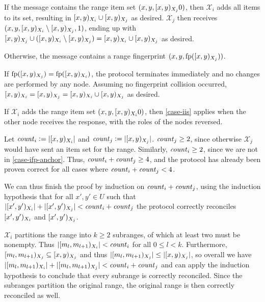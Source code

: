 \begin{caselist}
 \label{case-iis}  If the message contains the range item set $({x}, {y}, [{x},{y})_{X_j}{0})$, then $\mathcal{X}_i$ adds all items to its set, resulting in $[{x},{y})_{X_i} \cup [{x},{y})_{X_j}$ as desired. $\mathcal{X}_j$ then receives $({x}, {y}, {[{x},{y})_{X_i} \setminus [{x},{y})_{X_j}}, {1})$, ending up with $[{x},{y})_{X_j} \cup ([{x},{y})_{X_i} \setminus [{x},{y})_{X_j}) = [{x},{y})_{X_i} \cup [{x},{y})_{X_j}$ as desired.

 \label{case-ifp} Otherwise, the message contains a range fingerprint $({x}, {y}, {\operatorname{fp}([{x},{y})_{X_j})})$.

\begin{caselist}
 If $\operatorname{fp}([{x},{y})_{X_j}) = \operatorname{fp}([{x},{y})_{X_i})$, the protocol terminates immediately and no changes are performed by any node. Assuming no fingerprint collision occurred, $[{x},{y})_{X_i} = [{x},{y})_{X_j} = [{x},{y})_{X_i} \cup [{x},{y})_{X_j}$ as desired.

 \label{case-ifp-anchor} If $\mathcal{X}_i$ adds the range item set $({x}, {y}, [{x},{y})_{X_i}{0})$, then \cref{case-iis} applies when the other node receives the response, with the roles of the nodes reversed.

\case[Recurse] Let $\mathit{count}_{i} \vcentcolon= |{[{x},{y})_{X_i}}|$ and $\mathit{count}_{j} \vcentcolon= |{[{x},{y})_{X_j}}|$. $\mathit{count}_{j} \geq 2$, since otherwise $\mathcal{X}_j$ would have sent an item set for the range. Similarly, $\mathit{count}_{i} \geq 2$, since we are not in \cref{case-ifp-anchor}. Thus, $\mathit{count}_{i} + \mathit{count}_{j} \geq 4$, and the protocol has already been proven correct for all cases where $\mathit{count}_{i} + \mathit{count}_{j} < 4$.

We can thus finish the proof by induction on $\mathit{count}_{i} + \mathit{count}_{j}$, using the induction hypothesis that for all $x', y' \in U$ such that $|{[{x'},{y'})_{X_i}}| + |{[{x'},{y'})_{X_j}}| < \mathit{count}_{i} + \mathit{count}_{j}$ the protocol correctly reconciles $[{x'},{y'})_{X_i}$ and $[{x'},{y'})_{X_j}$.

$\mathcal{X}_i$ partitions the range into $k \geq 2$ subranges, of which at least two must be nonempty.
Thus $|{[{m_l},{m_{l + 1}})_{X_i}}| < \mathit{count}_{i}$ for all $0 \leq l < k$.
Furthermore, $[{m_l},{m_{l + 1}})_{X_j} \subseteq [{x},{y})_{X_j}$ and thus $|{[{m_l},{m_{l + 1}})_{X_j}}| \leq |{[{x},{y})_{X_j}}|$, so overall we have $|{[{m_l},{m_{l + 1}})_{X_i}}| + |{[{m_l},{m_{l + 1}})_{X_j}}| < \mathit{count}_{i} + \mathit{count}_{j}$ and can apply the induction hypothesis to conclude that every subrange is correctly reconciled. Since the subranges partition the original range, the original range is then correctly reconciled as well.
\end{caselist}
\end{caselist}


